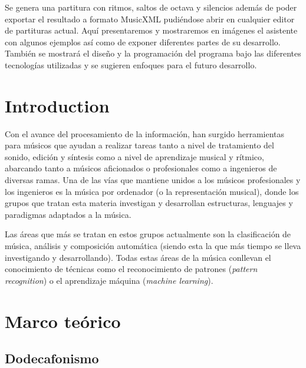 \documentclass[a4paper,openany,12pt]{memoir}
\begin{document}
Se genera una partitura con ritmos, saltos de octava y silencios además de poder exportar el resultado a formato MusicXML pudiéndose abrir en cualquier editor de partituras actual. Aquí presentaremos y mostraremos en imágenes el asistente con algunos ejemplos así como de exponer diferentes partes de su desarrollo. También se mostrará el diseño y la programación del programa bajo las diferentes tecnologías utilizadas y se sugieren enfoques para el futuro desarrollo.



\newpage


\tableofcontents %

\cleardoublepage
{} %
\listoffigures %





\chapter{Introduction}
Con el avance del procesamiento de la información, han surgido herramientas para músicos que ayudan a realizar tareas tanto a nivel de tratamiento del sonido, edición y síntesis como a nivel de aprendizaje musical y rítmico, abarcando tanto a músicos aficionados o profesionales como a ingenieros de diversas ramas. Una de las vías que mantiene unidos a los músicos profesionales y los ingenieros es la música por ordenador (o la representación musical), donde los grupos que tratan esta materia investigan y desarrollan estructuras, lenguajes y paradigmas adaptados a la música.

Las áreas que más se tratan en estos grupos actualmente son la clasificación de música, análisis y composición automática (siendo esta la que más tiempo se lleva investigando y desarrollando). Todas estas áreas de la música conllevan el conocimiento de técnicas como el reconocimiento de patrones (\emph{pattern recognition}) o el aprendizaje máquina (\emph{machine learning}).

\chapter{Marco teórico}\label{marcoteorico}
\section{Dodecafonismo}
\end{document}
